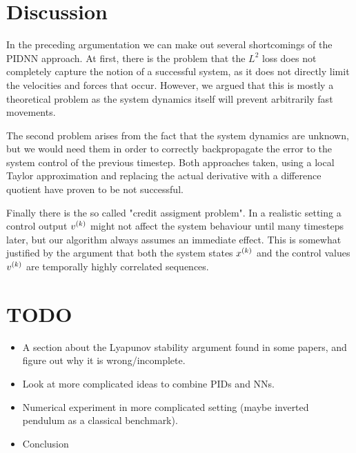 \documentclass{article}
\begin{document}
    \section{Discussion}
    In the preceding argumentation we can make out several shortcomings of the 
    PIDNN approach. At first, there is the problem that the $L^2$ loss does not 
    completely capture the notion of a successful system, as it does not 
    directly limit the velocities and forces that occur. However, we argued that
    this is mostly a theoretical problem as the system dynamics itself will 
    prevent arbitrarily fast movements. 

    The second problem arises from the fact that the system dynamics are unknown,
    but we would need them in order to correctly backpropagate the error to the 
    system control of the previous timestep. Both approaches taken, using a local
    Taylor approximation and replacing the actual derivative with a difference 
    quotient have proven to be not successful.

    Finally there is the so called "credit assigment problem". In a realistic 
    setting a control output ${v}^{(k)}$ might not affect the 
    system behaviour until many timesteps later, but our algorithm always 
    assumes an immediate effect. This is somewhat justified by the argument that
    both the system states ${x}^{(k)}$ and the control values 
    ${v}^{(k)}$ are temporally highly correlated sequences. 

    \section{TODO}
    \begin{itemize}
        \item A section about the Lyapunov stability argument found in some papers, and figure out 
                why it is wrong/incomplete.
                \cite{cong_novel_2005}
        \item Look at more complicated ideas to combine PIDs and NNs. 
                \cite{andrasik_-line_2004,zribi_new_2015}
        \item Numerical experiment in more complicated setting (maybe inverted pendulum as a 
              classical benchmark).
        \item Conclusion
    \end{itemize}


    
     
\end{document}
